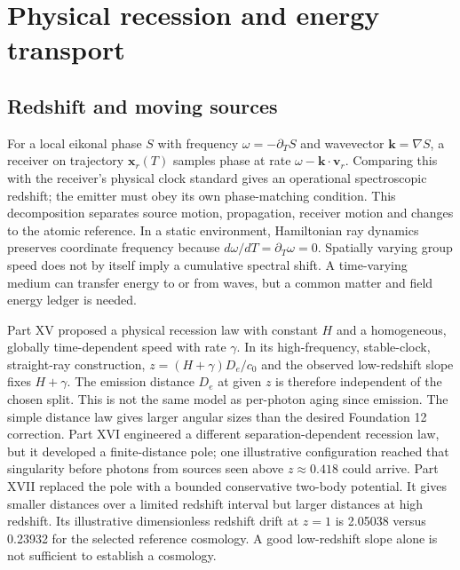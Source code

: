 \documentclass[
  11pt,
  twoside]{article}
\begin{document}
\section{Physical recession and energy
transport}\label{physical-recession-and-energy-transport}

\subsection{Redshift and moving
sources}\label{redshift-and-moving-sources}

For a local eikonal phase \(S\) with frequency \(\omega=-\partial_T S\)
and wavevector \(\mathbf{k}=\nabla S\), a receiver on trajectory
\(\mathbf{x}_r(T)\) samples phase at rate
\(\omega-\mathbf{k}\cdot\mathbf{v}_r\). Comparing this with the
receiver's physical clock standard gives an operational spectroscopic
redshift; the emitter must obey its own phase-matching condition. This
decomposition separates source motion, propagation, receiver motion and
changes to the atomic reference. In a static environment, Hamiltonian
ray dynamics preserves coordinate frequency because
\(d\omega/dT=\partial_T\omega=0\). Spatially varying group speed does
not by itself imply a cumulative spectral shift. A time-varying medium
can transfer energy to or from waves, but a common matter and field
energy ledger is needed.

Part XV proposed a physical recession law with constant \(H\) and a
homogeneous, globally time-dependent speed with rate \(\gamma\). In its
high-frequency, stable-clock, straight-ray construction,
\(z=(H+\gamma)D_e/c_0\) and the observed low-redshift slope fixes
\(H+\gamma\). The emission distance \(D_e\) at given \(z\) is therefore
independent of the chosen split. This is not the same model as
per-photon aging since emission. The simple distance law gives larger
angular sizes than the desired Foundation 12 correction. Part XVI
engineered a different separation-dependent recession law, but it
developed a finite-distance pole; one illustrative configuration reached
that singularity before photons from sources seen above
\(z\approx0.418\) could arrive. Part XVII replaced the pole with a
bounded conservative two-body potential. It gives smaller distances over
a limited redshift interval but larger distances at high redshift. Its
illustrative dimensionless redshift drift at \(z=1\) is 2.05038 versus
0.23932 for the selected reference cosmology. A good low-redshift slope
alone is not sufficient to establish a cosmology.
\end{document}
